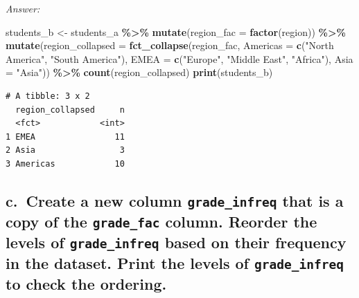 \documentclass[
]{book}
\newenvironment{Shaded}{\begin{snugshade}}{\end{snugshade}}
\newcommand{\AttributeTok}[1]{\textcolor[rgb]{0.13,0.29,0.53}{#1}}
\newcommand{\FunctionTok}[1]{\textcolor[rgb]{0.13,0.29,0.53}{\textbf{#1}}}
\newcommand{\NormalTok}[1]{#1}
\newcommand{\OtherTok}[1]{\textcolor[rgb]{0.56,0.35,0.01}{#1}}
\newcommand{\SpecialCharTok}[1]{\textcolor[rgb]{0.81,0.36,0.00}{\textbf{#1}}}
\newcommand{\StringTok}[1]{\textcolor[rgb]{0.31,0.60,0.02}{#1}}
\begin{document}
\emph{Answer:}

\begin{Shaded}
\begin{Highlighting}[]
\NormalTok{students\_b }\OtherTok{\textless{}{-}}\NormalTok{ students\_a }\SpecialCharTok{\%\textgreater{}\%}
  \FunctionTok{mutate}\NormalTok{(}\AttributeTok{region\_fac =} \FunctionTok{factor}\NormalTok{(region)) }\SpecialCharTok{\%\textgreater{}\%}
  \FunctionTok{mutate}\NormalTok{(}\AttributeTok{region\_collapsed =} \FunctionTok{fct\_collapse}\NormalTok{(region\_fac, }
                                         \AttributeTok{Americas =} \FunctionTok{c}\NormalTok{(}\StringTok{"North America"}\NormalTok{, }\StringTok{"South America"}\NormalTok{), }
                                         \AttributeTok{EMEA =} \FunctionTok{c}\NormalTok{(}\StringTok{"Europe"}\NormalTok{, }\StringTok{"Middle East"}\NormalTok{, }\StringTok{"Africa"}\NormalTok{), }
                                         \AttributeTok{Asia =} \StringTok{"Asia"}\NormalTok{)) }\SpecialCharTok{\%\textgreater{}\%}
  \FunctionTok{count}\NormalTok{(region\_collapsed)}
\FunctionTok{print}\NormalTok{(students\_b)}
\end{Highlighting}
\end{Shaded}

\begin{verbatim}
# A tibble: 3 x 2
  region_collapsed     n
  <fct>            <int>
1 EMEA                11
2 Asia                 3
3 Americas            10
\end{verbatim}

\hypertarget{c.-create-a-new-column-grade_infreq-that-is-a-copy-of-the-grade_fac-column.-reorder-the-levels-of-grade_infreq-based-on-their-frequency-in-the-dataset.-print-the-levels-of-grade_infreq-to-check-the-ordering.}{%
\subsection{\texorpdfstring{c.~Create a new column \texttt{grade\_infreq} that is a copy of the \texttt{grade\_fac} column. Reorder the levels of \texttt{grade\_infreq} based on their frequency in the dataset. Print the levels of \texttt{grade\_infreq} to check the ordering.}{c.~Create a new column grade\_infreq that is a copy of the grade\_fac column. Reorder the levels of grade\_infreq based on their frequency in the dataset. Print the levels of grade\_infreq to check the ordering.}}\label{c.-create-a-new-column-grade_infreq-that-is-a-copy-of-the-grade_fac-column.-reorder-the-levels-of-grade_infreq-based-on-their-frequency-in-the-dataset.-print-the-levels-of-grade_infreq-to-check-the-ordering.}}
\end{document}
